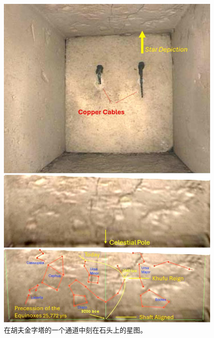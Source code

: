 \documentclass[10pt,twocolumn,letterpaper]{article}
\begin{document}
\begin{figure}[H]
\begin{center}
   \includegraphics[width=1\linewidth]{star-stone.jpg}
\end{center}
   \caption{在胡夫金字塔的一个通道中刻在石头上的星图\cite{28}。}
\label{fig:20}
\label{fig:onecol}
\end{figure}
\end{document}
